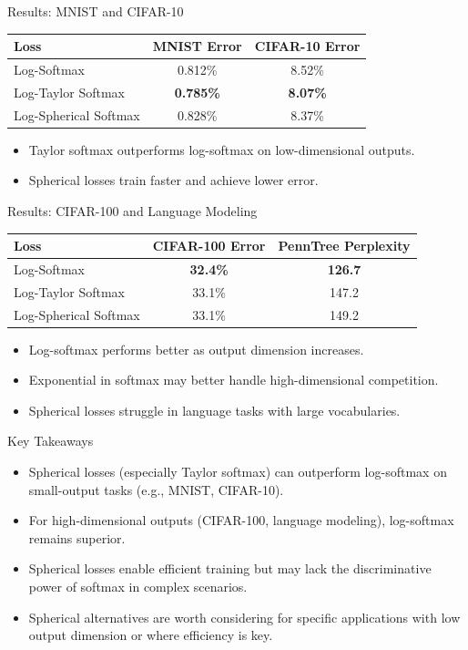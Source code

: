 \documentclass{beamer}
\begin{document}
\begin{frame}{Results: MNIST and CIFAR-10}
\begin{table}[h]
\centering
\begin{tabular}{|l|c|c|}
\hline
\textbf{Loss} & \textbf{MNIST Error} & \textbf{CIFAR-10 Error} \\
\hline
Log-Softmax & 0.812\% & 8.52\% \\
Log-Taylor Softmax & \textbf{0.785\%} & \textbf{8.07\%} \\
Log-Spherical Softmax & 0.828\% & 8.37\% \\
\hline
\end{tabular}
\end{table}
\begin{itemize}
    \item Taylor softmax outperforms log-softmax on low-dimensional outputs.
    \item Spherical losses train faster and achieve lower error.
\end{itemize}
\end{frame}

\begin{frame}{Results: CIFAR-100 and Language Modeling}
\begin{table}[h]
\centering
\begin{tabular}{|l|c|c|}
\hline
\textbf{Loss} & \textbf{CIFAR-100 Error} & \textbf{PennTree Perplexity} \\
\hline
Log-Softmax & \textbf{32.4\%} & \textbf{126.7} \\
Log-Taylor Softmax & 33.1\% & 147.2 \\
Log-Spherical Softmax & 33.1\% & 149.2 \\
\hline
\end{tabular}
\end{table}
\begin{itemize}
    \item Log-softmax performs better as output dimension increases.
    \item Exponential in softmax may better handle high-dimensional competition.
    \item Spherical losses struggle in language tasks with large vocabularies.
\end{itemize}
\end{frame}

\begin{frame}{Key Takeaways}
\begin{itemize}
    \item Spherical losses (especially Taylor softmax) can outperform log-softmax on small-output tasks (e.g., MNIST, CIFAR-10).
    \item For high-dimensional outputs (CIFAR-100, language modeling), log-softmax remains superior.
    \item Spherical losses enable efficient training but may lack the discriminative power of softmax in complex scenarios.
    \item Spherical alternatives are worth considering for specific applications with low output dimension or where efficiency is key.
\end{itemize}
\end{frame}
\end{document}

